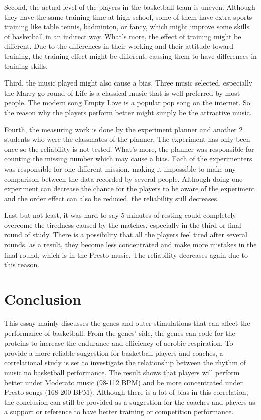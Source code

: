 \documentclass{article}
\begin{document}
Second, the actual level of the players in the basketball team is uneven. Although they have the same training time at high school, some of them have extra sports training like table tennis, badminton, or fancy, which might improve some skills of basketball in an indirect way. What's more, the effect of training might be different. Due to the differences in their working and their attitude toward training, the training effect might be different, causing them to have differences in training skills. 

Third, the music played might also cause a bias. Three music selected, especially the Marry-go-round of Life is a classical music that is well preferred by most people. The modern song Empty Love is a popular pop song on the internet. So the reason why the players perform better might simply be the attractive music. 

Fourth, the measuring work is done by the experiment planner and another 2 students who were the classmates of the planner. The experiment has only been once so the reliability is not tested. What's more, the planner was responsible for counting the missing number which may cause a bias. Each of the experimenters was responsible for one different mission, making it impossible to make any comparison between the data recorded by several people. Although doing one experiment can decrease the chance for the players to be aware of the experiment and the order effect can also be reduced, the reliability still decreases.

Last but not least, it was hard to say 5-minutes of resting could completely overcome the tiredness caused by the matches, especially in the third or final round of study. There is a possibility that all the players feel tired after several rounds, as a result, they become less concentrated and make more mistakes in the final round, which is in the Presto music. The reliability decreases again due to this reason.

\section{Conclusion}

This essay mainly discusses the genes and outer stimulations that can affect the performance of basketball. From the genes' side, the genes can code for the proteins to increase the endurance and efficiency of aerobic respiration. To provide a more reliable suggestion for basketball players and coaches, a correlational study is set to investigate the relationship between the rhythm of music no basketball performance. The result shows that players will perform better under Moderato music (98-112 BPM) and be more concentrated under Presto songs (168-200 BPM). Although there is a lot of bias in this correlation, the conclusion can still be provided as a suggestion for the coaches and players as a support or reference to have better training or competition performance.
\newpage
\printbibliography{}
\end{document}
